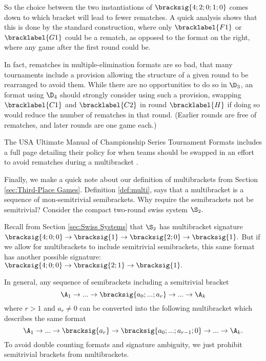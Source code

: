 {    So the choice between the two instantiations of $\bracksig{4;2;0;1;0}$ comes down to which bracket will lead to fewer rematches. A quick analysis shows that this is done by the standard construction, where only $\bracklabel{F1}$ or $\bracklabel{G1}$ could be a rematch, as opposed to the format on the right, where any game after the first round could be.

    In fact, rematches in multiple-elimination formats are so bad, that many tournaments include a provision allowing the structure of a given round to be rearranged to avoid them. While there are no opportunities to do so in $\D_3$, an format using $\D_4$ should strongly consider using such a provision, swapping $\bracklabel{C1}$ and $\bracklabel{C2}$ in round $\bracklabel{H}$ if doing so would reduce the number of rematches in that round. (Earlier rounds are free of rematches, and later rounds are one game each.)


   The USA Ultimate Manual of Championship Series Tournament Formats includes a full page detailing their policy for when teams should be swapped in an effort to avoid rematches during a multibracket \cite{ultimate}.

   Finally, we make a quick note about our definition of multibrackets from Section \ref{sec:Third-Place Games}.
   Definition \ref{def:multi}, says that a multibracket is a sequence of \i{non-semitrivial} semibrackets. Why require the semibrackets not be semitrivial? Consider the compact two-round swiss system $\S_2.$


   Recall from Section \ref{sec:Swiss Systems} that $\S_2$ has multibracket signature $\bracksig{4;0;0} \to \bracksig{1} \to \bracksig{2;0} \to \bracksig{1}.$ But if we allow for multibrackets to include semitrivial semibrackets, this same format has another possible signature: $\bracksig{4;0;0} \to \bracksig{2;1} \to \bracksig{1}.$

   In general, any sequence of semibrackets including a semitrivial bracket $$\A_1 \to ... \to \bracksig{a_0; ...; a_r} \to ... \to \A_k$$ where $r > 1$ and $a_r \neq 0$ can be converted into the following multibracket which describes the same format $$\A_1 \to ... \to \bracksig{a_r} \to \bracksig{a_0; ...; a_{r-1}; 0} \to ... \to \A_k.$$ To avoid double counting formats and signature ambiguity, we just prohibit semitrivial brackets from multibrackets.
}

